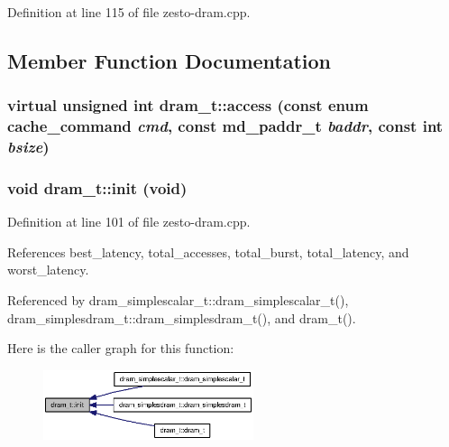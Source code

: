 Definition at line 115 of file zesto-dram.cpp.

\subsection{Member Function Documentation}
\subsubsection[{access}]{\setlength{\rightskip}{0pt plus 5cm}virtual unsigned int dram\_\-t::access (const enum {\bf cache\_\-command} {\em cmd}, \/  const {\bf md\_\-paddr\_\-t} {\em baddr}, \/  const int {\em bsize})\hspace{0.3cm}{\tt  [pure virtual]}}\label{classdram__t_9c02655f90df06afb87bed84e0a14883}


\subsubsection[{init}]{\setlength{\rightskip}{0pt plus 5cm}void dram\_\-t::init (void)\hspace{0.3cm}{\tt  [protected]}}\label{classdram__t_272d9b6042655780d600eaa9e64324d1}




Definition at line 101 of file zesto-dram.cpp.

References best\_\-latency, total\_\-accesses, total\_\-burst, total\_\-latency, and worst\_\-latency.

Referenced by dram\_\-simplescalar\_\-t::dram\_\-simplescalar\_\-t(), dram\_\-simplesdram\_\-t::dram\_\-simplesdram\_\-t(), and dram\_\-t().

Here is the caller graph for this function:\nopagebreak
\begin{figure}[H]
\begin{center}
\leavevmode
\includegraphics[width=175pt]{classdram__t_272d9b6042655780d600eaa9e64324d1_icgraph}
\end{center}
\end{figure}
